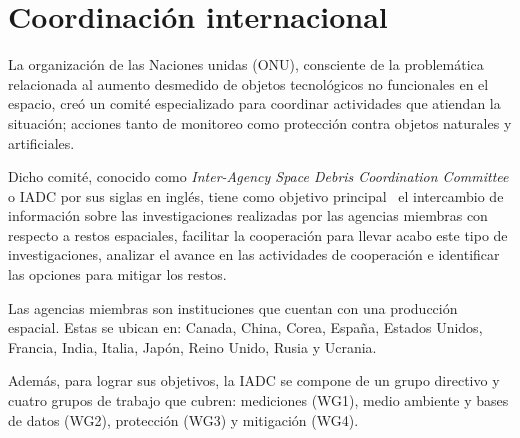 \section*{Coordinación internacional} \label{sec:coordinacion}

La organización de las Naciones unidas (ONU), consciente de la problemática relacionada al aumento desmedido de objetos tecnológicos no funcionales en el espacio, creó un comité especializado para coordinar actividades que atiendan la situación;
acciones tanto de monitoreo como protección contra objetos naturales y artificiales.

Dicho comité, conocido como  \textit{Inter-Agency Space Debris Coordination Committee} o IADC por sus siglas en inglés,
tiene como objetivo principal~\cite{iadc_doc} el intercambio de información sobre las investigaciones realizadas por las agencias miembras con respecto a restos espaciales,
facilitar la cooperación para llevar acabo este tipo de investigaciones, 
analizar el avance en las actividades de cooperación 
e identificar las opciones para mitigar los restos.

Las agencias miembras son instituciones que cuentan con una producción espacial. 
Estas se ubican en:  
Canada, China, Corea, España, Estados Unidos, Francia, India, Italia, Japón, Reino Unido, Rusia y Ucrania.

Además, para lograr sus objetivos,
la IADC se compone de un grupo directivo y cuatro grupos de trabajo que cubren:
mediciones (WG1),
medio ambiente y bases de datos (WG2),
protección (WG3) 
y
mitigación (WG4).


